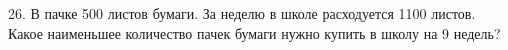 26. В пачке 500 листов бумаги. За неделю в школе расходуется 1100 листов. Какое наименьшее количество пачек бумаги нужно купить в школу на 9 недель?\\

